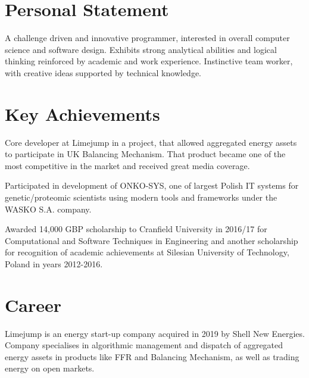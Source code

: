 \documentclass[12pt,english]{resume}
\begin{document}

	\begin{center}
		

		
	\end{center}
	
	\section{Personal Statement}
		A challenge driven and innovative programmer, interested in overall computer
		science and software design. Exhibits strong analytical abilities and logical
		thinking reinforced by academic and work experience. Instinctive team worker,
		with creative ideas supported by technical knowledge.

	\section{Key Achievements}
		Core developer at Limejump in a project, that allowed aggregated energy assets to participate in UK Balancing Mechanism. That product became one of the most competitive in the market and received great media coverage.

		\noindent
		Participated in development of ONKO-SYS, one of largest Polish IT systems for genetic/proteomic scientists using modern tools and frameworks under the WASKO S.A. company.

		\noindent
		Awarded 14,000 GBP scholarship to Cranfield University in 2016/17 for Computational and Software Techniques in Engineering and another scholarship for recognition of academic achievements at Silesian University of Technology, Poland in years 2012-2016.

	\section{Career}

		Limejump is an energy start-up company acquired in 2019 by Shell New Energies. Company specialises in algorithmic management and dispatch of aggregated energy assets in products like FFR and Balancing Mechanism, as well as trading energy on open markets.
\end{document}

